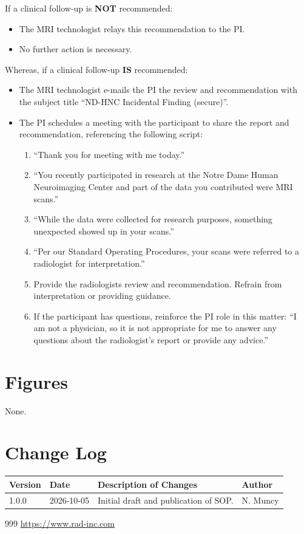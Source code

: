 \documentclass[11pt]{article}
\begin{document}
If a clinical follow-up is \textbf{NOT} recommended:

\begin{itemize}
    \item The MRI technologist relays this recommendation to the PI.
    \item No further action is necessary.
\end{itemize}


Whereas, if a clinical follow-up \textbf{IS} recommended:

\begin{itemize}
    \item The MRI technologist e-mails the PI the review and recommendation with the subject title ``ND-HNC Incidental Finding (secure)''.
    \item The PI schedules a meeting with the participant to share the report and recommendation, referencing the following script:
    \begin{enumerate}
        \item ``Thank you for meeting with me today.''
        \item ``You recently participated in research at the Notre Dame Human Neuroimaging Center and part of the data you contributed were MRI scans.''
        \item ``While the data were collected for research purposes, something unexpected showed up in your scans.''
        \item ``Per our Standard Operating Procedures, your scans were referred to a radiologist for interpretation.''
        \item Provide the radiologists review and recommendation. Refrain from interpretation or providing guidance.
        \item If the participant has questions, reinforce the PI role in this matter: ``I am not a physician, so it is not appropriate for me to answer any questions about the radiologist's report or provide any advice.''
    \end{enumerate}
\end{itemize}

\section{Figures}

None.


\pagebreak

\section{Change Log}
\noindent
\begin{tabularx}{\textwidth}{@{} l l X l @{}}
\toprule
\textbf{Version} & \textbf{Date} & \textbf{Description of Changes} & \textbf{Author} \\
\midrule
1.0.0 & 2026-10-05 & Initial draft and publication of SOP. & N. Muncy \\

\bottomrule
\end{tabularx}


\pagebreak

\begin{thebibliography}{999}
        \url{https://www.rad-inc.com}
\end{thebibliography}
\end{document}

